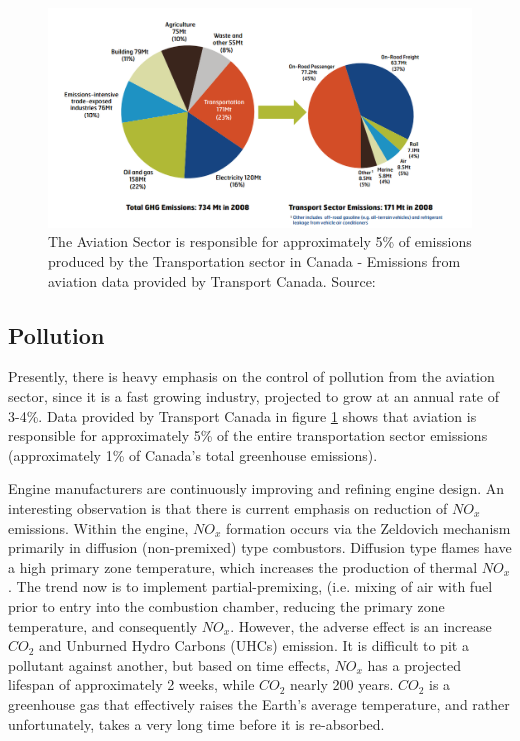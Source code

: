 \documentclass{aer1315-pretty}
\begin{document}
\begin{figure}
\centering
\includegraphics[height=0.42\textwidth]{figures/TotalEmissions.png}
	\caption{The Aviation Sector is responsible for approximately 5\% of emissions produced by the Transportation sector in Canada - Emissions from aviation data provided by Transport Canada. Source: \cite{TransportCanada}}	
	\label{fig:Emissions}
\end{figure}

\pagebreak[3]


\goodbreak
\subsection{Pollution}

Presently, there is heavy emphasis on the control of pollution from the aviation sector, since it is a fast growing industry, projected to grow at an annual rate of 3-4\%. Data provided by Transport Canada \cite{TransportCanada} in figure \ref{fig:Emissions} shows that aviation is responsible for approximately 5\% of the entire transportation sector emissions (approximately 1\% of Canada's total greenhouse emissions).\par  

Engine manufacturers are continuously improving and refining engine design. An interesting observation is that there is current emphasis on reduction of $NO_x$ emissions. Within the engine, $NO_x$ formation occurs via the Zeldovich mechanism primarily in diffusion (non-premixed) type combustors. Diffusion type flames have a high primary zone temperature, which increases the production of thermal $NO_x$. The trend now is to implement partial-premixing, (i.e. mixing of air with fuel prior to entry into the combustion chamber, reducing the primary zone temperature, and consequently $NO_x$. However, the adverse effect is an increase $CO_2$ and Unburned Hydro Carbons (UHCs) emission. It is difficult to pit a pollutant against another, but based on time effects, $NO_x$ has a projected lifespan of approximately 2 weeks, while $CO_2$ nearly 200 years. $CO_2$ is a greenhouse gas that effectively raises the Earth's average temperature, and rather unfortunately, takes a very long time before it is re-absorbed.\par
\end{document}
